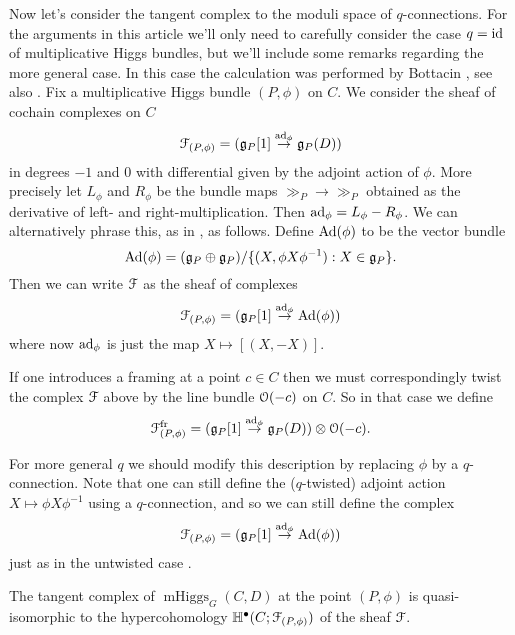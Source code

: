 \documentclass[10pt, oneside]{article}
\DeclareMathOperator{\mhiggs}{mHiggs}
\newcommand{\fr}{\mathrm{fr}}
\renewcommand{\ad}{\mr{ad}}
\newcommand{\Ad}{\mr{Ad}}
\begin{document}
Now let's consider the tangent complex to the moduli space of $q$-connections.  For the arguments in this article we'll only need to carefully consider the case $q=\operatorname{id}$ of multiplicative Higgs bundles, but we'll include some remarks regarding the more general case.  In this case the calculation was performed by Bottacin \cite{Bottacin}, see also \cite[Section 4]{HurtubiseMarkman}. Fix a multiplicative Higgs bundle $(P,\phi)$ on $C$.  We consider the sheaf of cochain complexes on $C$
\[\mc F_{(P,\phi)} = (\gg_P[1] \overset {\ad_\phi} {\to} \gg_P(D))\]
in degrees $-1$ and 0 with differential given by the adjoint action of $\phi$.  More precisely let $L_\phi$ and $R_\phi$ be the bundle maps $\gg_P \to \gg_P$ obtained as the derivative of left- and right-multiplication.  Then $\ad_\phi = L_\phi - R_\phi$.  We can alternatively phrase this, as in \cite[Section 4]{HurtubiseMarkman}, as follows.  Define $\Ad(\phi)$ to be the vector bundle
\[\Ad(\phi) = (\gg_P \oplus \gg_P)/\{(X, \phi X \phi^{-1}): X \in \gg_P\}.\]
Then we can write $\mathcal{F}$ as the sheaf of complexes
\[\mc F_{(P,\phi)} = (\gg_P[1] \overset {\ad_\phi} {\to} \Ad(\phi))\]
where now $\ad_\phi$ is just the map $X \mapsto [(X,-X)]$.

\begin{remark}
If one introduces a framing at a point $c \in C$ then we must correspondingly twist the complex $\mathcal{F}$ above by the line bundle $\mathcal{O}(-c)$ on $C$.  So in that case we define
\[\mc F^\fr_{(P,\phi)} = (\gg_P[1] \overset {\ad_\phi} {\to} \gg_P(D)) \otimes \OO(-c).\]
\end{remark}

\begin{remark}
For more general $q$ we should modify this description by replacing $\phi$ by a $q$-connection.  Note that one can still define the ($q$-twisted) adjoint action $X \mapsto \phi X \phi^{-1}$ using a $q$-connection, and so we can still define the complex
\[\mc F_{(P,\phi)} = (\gg_P[1] \overset {\ad_\phi} {\to} \Ad(\phi))\]
just as in the untwisted case .
\end{remark}

\begin{prop}
The tangent complex of $\mhiggs_G(C, D)$ at the point $(P,\phi)$ is quasi-isomorphic to the hypercohomology $\mathbb{H}^\bullet(C; \mathcal{F}_{(P,\phi)})$ of the sheaf $\mathcal{F}$.
\end{prop}
\end{document}
